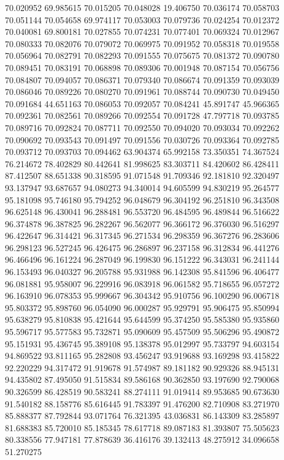 70.020952
69.985615
70.015205
70.048028
19.406750
70.036174
70.058703
70.051144
70.054658
69.974117
70.053003
70.079736
70.024254
70.012372
70.040081
69.800181
70.027855
70.074231
70.077401
70.069324
70.012967
70.080333
70.082076
70.079072
70.069975
70.091952
70.058318
70.019558
70.056964
70.082791
70.082293
70.091555
70.075675
70.081372
70.090780
70.089451
70.083191
70.068898
70.089306
70.001948
70.087154
70.056756
70.084807
70.094057
70.086371
70.079340
70.086674
70.091359
70.093039
70.086046
70.089226
70.080270
70.091961
70.088744
70.090730
70.049450
70.091684
44.651163
70.086053
70.092057
70.084241
45.891747
45.966365
70.092361
70.082561
70.089266
70.092554
70.091728
47.797718
70.093785
70.089716
70.092824
70.087711
70.092550
70.094020
70.093034
70.092262
70.090692
70.093543
70.091497
70.091556
70.030726
70.093364
70.092785
70.093712
70.093703
70.094462
63.904374
65.992158
73.350351
74.367524
76.214672
78.402829
80.442641
81.998625
83.303711
84.420602
86.428411
87.412507
88.651338
90.318595
91.071548
91.709346
92.181810
92.320497
93.137947
93.687657
94.080273
94.340014
94.605599
94.830219
95.264577
95.181098
95.746180
95.794252
96.048679
96.304192
96.251810
96.343508
96.625148
96.430041
96.288481
96.553720
96.484595
96.489844
96.516622
96.374878
96.387825
96.282267
96.562077
96.366172
96.376030
96.516297
96.422647
96.314421
96.317345
96.271534
96.298359
96.367276
96.283606
96.298123
96.527245
96.426475
96.286897
96.237158
96.312834
96.441276
96.466496
96.161224
96.287049
96.199830
96.151222
96.343031
96.241144
96.153493
96.040327
96.205788
95.931988
96.142308
95.841596
96.406477
96.081881
95.958007
96.229916
96.083918
96.061582
95.718655
96.057272
96.163910
96.078353
95.999667
96.304342
95.910756
96.100290
96.006718
95.803372
95.898760
96.054090
96.000287
95.929791
95.906475
95.850994
95.638279
95.810838
95.421644
95.644599
95.374250
95.585380
95.935860
95.596717
95.577583
95.732871
95.090609
95.457509
95.506296
95.490872
95.151931
95.436745
95.389108
95.138378
95.012997
95.733797
94.603154
94.869522
93.811165
95.282808
93.456247
93.919688
93.169298
93.415822
92.220229
94.317472
91.919678
91.574987
89.181182
90.929326
88.945131
94.435802
87.495050
91.515834
89.586168
90.362850
93.197690
92.790068
90.326599
86.428519
90.583241
88.274111
91.019414
89.953685
90.673630
91.540182
88.158776
85.616445
91.783397
91.476200
82.710908
83.271970
85.888377
87.792844
93.071764
76.321395
43.036831
86.143309
83.285897
81.688383
85.720010
85.185345
78.617718
89.087183
81.393807
75.505623
80.338556
77.947181
77.878639
36.416176
39.132413
48.275912
34.096658
51.270275
